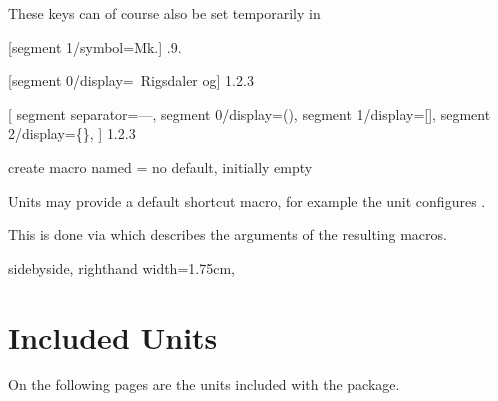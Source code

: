 \documentclass{article}
\begin{document}
These keys can of course also be set temporarily in 

\begin{dispExample}
	[segment 1/symbol=Mk.]
	{.9.}

	[segment 0/display={}{~Rigsdaler og}]
	{1.2.3}

[
		segment separator={---},
		segment 0/display={(}{)},
		segment 1/display={[}{]},
		segment 2/display={\{}{\}},
	]
	{1.2.3}
\end{dispExample}

\begin{docKey}
	{create macro named}
	{=}
	{no default, initially empty}
	
	Units may provide a default shortcut macro, for example the  unit configures .
	
	This is done via  which describes the arguments of the resulting macros.

\begin{dispExample*}{
	sidebyside,
	righthand width=1.75cm,
}
\end{dispExample*}
\end{docKey}

\clearpage
\section{Included Units} %

\label{units:included}
On the following pages are the units included with the package.


\clearpage
{}


\printindex  %
\end{document}
